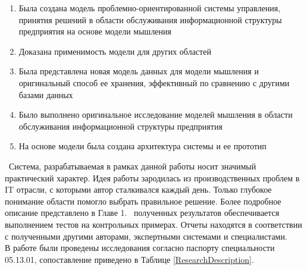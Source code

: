 \novelty
\begin{enumerate}
  \item Была создана модель проблемно-ориентированной системы управления, принятия решений в области обслуживания информационной структуры предприятия на основе модели мышления
  \item Доказана применимость модели для других областей
  \item Была представлена новая модель данных для модели мышления и оригинальный способ ее хранения, эффективный по сравнению с другими базами данных
  \item Было выполнено оригинальное исследование моделей мышления в области обслуживания информационной структуры предприятия
  \item На основе модели была создана архитектура системы и ее прототип 
\end{enumerate}

\influence\ 
Система, разрабатываемая в рамках данной работы носит значимый практический характер. Идея работы зародилась из производственных проблем в IT отрасли, с которыми автор сталкивался каждый день. Только глубокое понимание области помогло выбрать правильное решение. Более подробное описание представлено в Главе 1.
\reliability\ полученных результатов обеспечивается выполнением тестов на контрольных примерах. Отчеты находятся в соответствии с полученными другими авторами, экспертными системами и специалистами. \\ 
В работе были проведены исследования согласно паспорту специальности 05.13.01, сопоставление приведено в Таблице \ref{ResearchDescription}.

